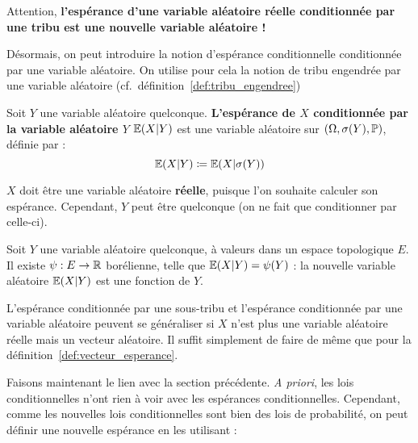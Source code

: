 \documentclass[../integ-proba.tex]{subfiles}
\begin{document}
    \begin{rem}
        Attention, \textbf{l'espérance d'une variable aléatoire réelle conditionnée par une tribu est une nouvelle variable aléatoire !}
    \end{rem}

    Désormais, on peut introduire la notion d'espérance conditionnelle conditionnée par une variable aléatoire.
    On utilise pour cela la notion de tribu engendrée par une variable aléatoire (cf.\ définition~\ref{def:tribu_engendree})

    \begin{defi}
        Soit $Y$ une variable aléatoire quelconque.
        \textbf{L'espérance de $X$ conditionnée par la variable aléatoire $Y$ $\mathbb{E}(X | Y)$} est une variable aléatoire sur $\left( \Omega, \sigma(Y), \mathbb{P} \right)$, définie par :
        \begin{displaymath}
            \mathbb{E}(X | Y) \coloneqq \mathbb{E}(X | \sigma(Y))
        \end{displaymath}
    \end{defi}

    \begin{rem}
        $X$ doit être une variable aléatoire \textbf{réelle}, puisque l'on souhaite calculer son espérance.
        Cependant, $Y$ peut être quelconque (on ne fait que conditionner par celle-ci).
    \end{rem}

    \begin{prop}
        Soit $Y$ une variable aléatoire quelconque, à valeurs dans un espace topologique $E$.
        Il existe $\psi : E \rightarrow \mathbb{R}$ borélienne, telle que $\mathbb{E}(X | Y) = \psi(Y)$ : la nouvelle variable aléatoire $\mathbb{E}(X | Y)$ est une fonction de $Y$.
    \end{prop}

    \begin{rem}
        L'espérance conditionnée par une sous-tribu et l'espérance conditionnée par une variable aléatoire peuvent se généraliser si $X$ n'est plus une variable aléatoire réelle mais un vecteur aléatoire.
        Il suffit simplement de faire de même que pour la définition~\ref{def:vecteur_esperance}.
    \end{rem}

    Faisons maintenant le lien avec la section précédente.
    \textit{A priori}, les lois conditionnelles n'ont rien à voir avec les espérances conditionnelles.
    Cependant, comme les nouvelles lois conditionnelles sont bien des lois de probabilité, on peut définir une nouvelle espérance en les utilisant :
\end{document}

